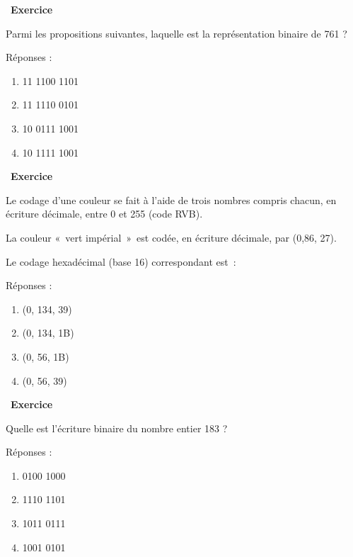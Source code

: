 \documentclass[
  11pt,
]{article}
\providecommand{\tightlist}{%
  \setlength{\itemsep}{0pt}\setlength{\parskip}{0pt}}
\newcounter{exo}
\newenvironment{exercice}[1]
{\par \medskip   \addtocounter{exo}{1} \noindent  
\begin{bclogo}[arrondi =0.1,   noborder = true, logo=\bccrayon, marge=4]{~\textbf{Exercice} \textbf{\theexo} {\itshape #1} }  \par}
{
\end{bclogo}
 \par \bigskip }
\newcounter{prop}
\newcounter{def}
\begin{document}
\begin{exercice}{}

Parmi les propositions suivantes, laquelle est la représentation binaire
de 761 ?

Réponses :

\begin{enumerate}
\def\labelenumi{\arabic{enumi}.}
\tightlist
\item
  11 1100 1101
\item
  11 1110 0101
\item
  10 0111 1001
\item
  10 1111 1001
\end{enumerate}

\end{exercice}

\begin{exercice}{}

Le codage d'une couleur se fait à l'aide de trois nombres compris
chacun, en écriture décimale, entre 0 et 255 (code RVB).

La couleur «~vert impérial~»~est codée, en écriture décimale, par (0,86,
27).

Le codage hexadécimal (base 16) correspondant est~:

Réponses :

\begin{enumerate}
\def\labelenumi{\arabic{enumi}.}
\tightlist
\item
  (0, 134, 39)
\item
  (0, 134, 1B)
\item
  (0, 56, 1B)
\item
  (0, 56, 39)
\end{enumerate}

\end{exercice}

\begin{exercice}{}

Quelle est l'écriture binaire du nombre entier 183 ?

Réponses :

\begin{enumerate}
\def\labelenumi{\arabic{enumi}.}
\tightlist
\item
  0100 1000
\item
  1110 1101
\item
  1011 0111
\item
  1001 0101
\end{enumerate}

\end{exercice}
\end{document}
